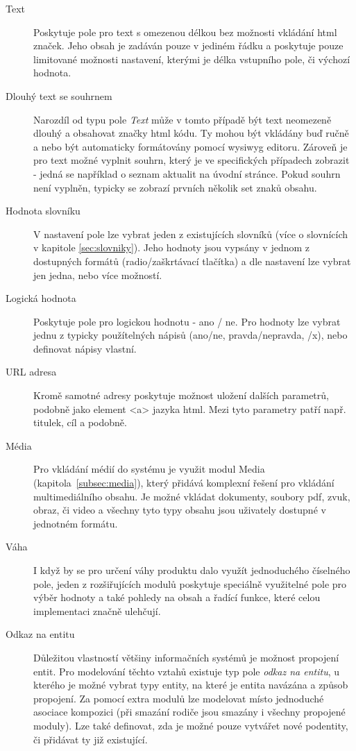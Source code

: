 \begin{description}
  \item[Text] Poskytuje pole pro text s omezenou délkou bez možnosti vkládání html značek. Jeho obsah je zadáván pouze v jediném řádku a poskytuje pouze limitované možnosti nastavení, kterými je délka vstupního pole, či výchozí hodnota. 
  
  \item[Dlouhý text se souhrnem] Narozdíl od typu pole \emph{Text} může v tomto případě být text neomezeně dlouhý a obsahovat značky html kódu. Ty mohou být vkládány buď ručně a nebo být automaticky formátovány pomocí \gls{wysiwyg} editoru. Zároveň je pro text možné vyplnit souhrn, který je ve specifických případech zobrazit - jedná se například o seznam aktualit na úvodní stránce. Pokud souhrn není vyplněn, typicky se zobrazí prvních několik set znaků obsahu.
  
  \item[Hodnota slovníku] V nastavení pole lze vybrat jeden z existujících slovníků (více o slovnících v kapitole \ref{sec:slovniky}). Jeho hodnoty jsou vypsány v jednom z dostupných formátů (radio/zaškrtávací tlačítka) a dle nastavení lze vybrat jen jedna, nebo více možností.
  
  \item[Logická hodnota] Poskytuje pole pro logickou hodnotu - ano / ne. Pro hodnoty lze vybrat jednu z typicky použítelných nápisů (ano/ne, pravda/nepravda, \checkmark/x), nebo definovat nápisy vlastní. 

  \item[URL adresa] Kromě samotné adresy poskytuje možnost uložení dalších parametrů, podobně jako element <a> jazyka html. Mezi tyto parametry patří např. titulek, cíl a podobně.

  \item[Média] Pro vkládání médií do systému je využit modul Media (kapitola~\ref{subsec:media}), který přidává komplexní řešení pro vkládání multimediálního obsahu. Je možné vkládat dokumenty, soubory pdf, zvuk, obraz, či video a všechny tyto typy obsahu jsou uživately dostupné v jednotném formátu.
  
  \item[Váha] I když by se pro určení váhy produktu dalo využít jednoduchého číselného pole, jeden z rozšiřujících modulů poskytuje speciálně využitelné pole pro výběr hodnoty a také pohledy na obsah a řadící funkce, které celou implementaci značně ulehčují.
  
  \item[Odkaz na entitu] Důležitou vlastností většiny informačních systémů je možnost propojení entit. Pro modelování těchto vztahů existuje typ pole \emph{odkaz na entitu}, u kterého je možné vybrat typy entity, na které je entita navázána a způsob propojení. Za pomocí extra modulů lze modelovat místo jednoduché asociace kompozici (při smazání rodiče jsou smazány i všechny propojené moduly). Lze také definovat, zda je možné pouze vytvářet nové podentity, či přidávat ty již existující.
\end{description}
